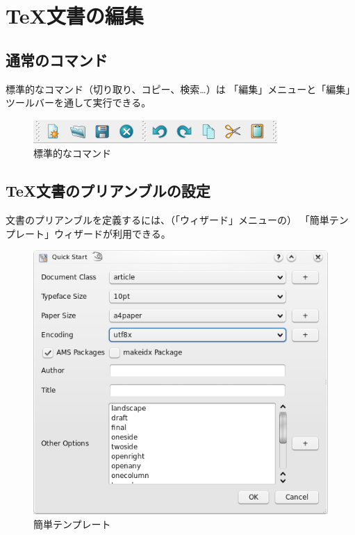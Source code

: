 \chapter{TeX文書の編集}

\section{通常のコマンド}

標準的なコマンド（切り取り、コピー、検索…）は
「編集」メニューと「編集」ツールバーを通して実行できる。

\begin{figure}[H]
  \centering
  \includegraphics{doc1.png}
  \caption{標準的なコマンド}
\end{figure}

\section{TeX文書のプリアンブルの設定}

文書のプリアンブルを定義するには、（「ウィザード」メニューの）
「簡単テンプレート」ウィザードが利用できる。

\begin{figure}[H]
  \centering
  \includegraphics{doc2.png}
  \caption{簡単テンプレート}
\end{figure}

